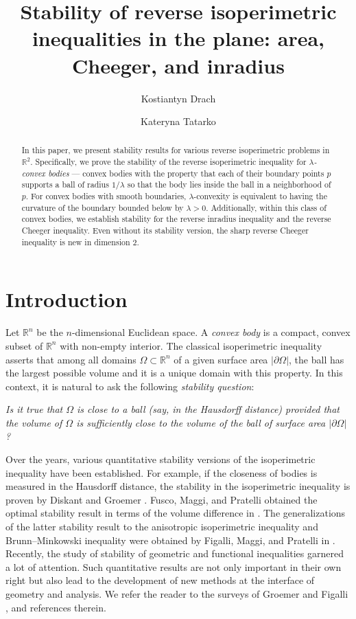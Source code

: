 \documentclass[11pt, oneside]{amsart}
\title[Stability of planar reverse isoperimetric inequalities]{Stability of reverse isoperimetric inequalities in the plane: area, Cheeger, and inradius}
\author[Kostiantyn Drach]{Kostiantyn Drach}
\author[Kateryna Tatarko]{Kateryna Tatarko}
\date{}
\newcommand{\R}{\mathbb{R}}
\theoremstyle{theorem}
\theoremstyle{Intro}
\theoremstyle{definition}
\theoremstyle{remark}
\theoremstyle{claim}
\numberwithin{equation}{section}
\begin{document}
\begin{abstract}
In this paper, we present stability results for various reverse isoperimetric problems in $\R^2$. Specifically, we prove the stability of the reverse isoperimetric inequality for \emph{$\lambda$-convex bodies} --- convex bodies 
with the property that each of their boundary points $p$ supports a ball of radius $1/\lambda$ so that the body lies inside the ball in a neighborhood of $p$. For convex bodies with smooth boundaries, $\lambda$-convexity is equivalent to having the curvature of the boundary bounded below by $\lambda > 0$. Additionally, within this class of convex bodies, we establish stability for the reverse inradius inequality and the reverse Cheeger inequality. Even without its stability version, the sharp reverse Cheeger inequality is new in dimension $2$.  
\end{abstract}

\maketitle

\section{Introduction}


Let  $\R^n$ be the  $n$-dimensional Euclidean space. A \emph{convex body} is a compact, convex subset of $\R^n$ with non-empty interior.   The classical isoperimetric inequality asserts that among all domains $\Omega \subset \R^n$ of a given surface area $|\partial \Omega|$, the ball has the largest possible volume and it is a unique domain with this property. In this context, it is natural to ask the following \emph{stability question}: 

\smallskip
{\it Is it true that $\Omega$ is close to a ball (say, in the Hausdorff distance) provided that the volume of $\Omega$ is sufficiently close to the volume of the ball of surface area $|\partial \Omega|$?}
\smallskip


Over the years, various quantitative stability versions of the isoperimetric inequality have been established. For example, if the closeness of bodies is measured in the Hausdorff distance, the stability in the isoperimetric inequality is proven by Diskant \cite{Di} and Groemer \cite{Gr2}. Fusco, Maggi, and Pratelli obtained the optimal stability result in terms of the volume difference in \cite{FMP}. The generalizations of the latter stability result to the anisotropic isoperimetric inequality and Brunn--Minkowski inequality were obtained by Figalli, Maggi, and Pratelli in \cite{FiMP, FiMP2}. Recently, the study of stability of geometric and functional inequalities garnered a lot of attention. Such quantitative results are not only important in their own right but also lead to the development of new methods at the interface of geometry and analysis. We refer the reader to the surveys of Groemer \cite{Gr} and Figalli \cite{Fi}, and references therein.
\end{document}
